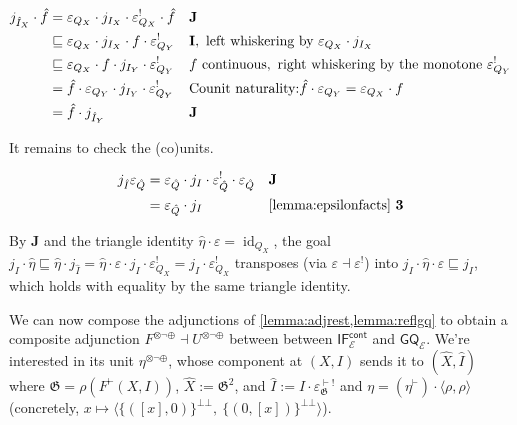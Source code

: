 \documentclass{article}
\theoremstyle{definition}
\newcommand{\G}{\mathfrak{G}}
\newcommand{\cE}{\mathcal{E}}
\newcommand{\cat}[1]{\mathsf{#1}}
\newcommand{\id}{\operatorname{id}}
\begin{document}
{\begin{align*}
        j_{\hat I_X}\cdot \hat f
          &=\varepsilon_{Q_X} \cdot j_{I_X} \cdot \varepsilon_{Q_X}^! \cdot \hat f
          && \text{\bf J}\\
          &\sqsubseteq \varepsilon_{Q_X} \cdot j_{I_X} \cdot f \cdot \varepsilon_{Q_Y}^!
          && \text{\bf I}, \text{ left whiskering by } \varepsilon_{Q_X} \cdot j_{I_X}\\
          &\sqsubseteq \varepsilon_{Q_X} \cdot f \cdot j_{I_Y} \cdot \varepsilon_{Q_Y}^!
          && f \text{ continuous},\ \text{right whiskering by the monotone } \varepsilon_{Q_Y}^!\\
          &= \hat f \cdot \varepsilon_{Q_Y} \cdot j_{I_Y} \cdot \varepsilon_{Q_Y}^!
          && \text{Counit naturality:} \hat f \cdot \varepsilon_{Q_Y} = \varepsilon_{Q_X} \cdot f\\
          &= \hat f \cdot j_{\hat I_Y}
          && \text{\bf J}
    \end{align*}
    

It remains to check the (co)units. 

\begin{align*}
    j_{\hat I} \varepsilon_{\hat Q}&=\varepsilon_{\hat Q} \cdot j_I \cdot  \varepsilon_{\hat Q}^! \cdot  \varepsilon_{\hat Q} &&\text{{\bf J}}\\ 
    &=\varepsilon_{\hat Q} \cdot j_I  &&\text{\cref{lemma:epsilonfacts} {\bf 3}}\\ 
\end{align*}


By {\bf J} and the triangle identity $\hat\eta\cdot\varepsilon=\id_{Q_X}$, the goal
    $j_I\cdot\hat\eta\sqsubseteq\hat\eta\cdot j_{\hat I}=\hat\eta\cdot\varepsilon\cdot j_I\cdot\varepsilon^!_{Q_X}=j_I\cdot\varepsilon^!_{Q_X}$
    transposes (via $\varepsilon\dashv\varepsilon^!$) into
    $j_I\cdot\hat\eta\cdot\varepsilon\sqsubseteq j_I$, which holds with equality by the
    same triangle identity.


}

We can now compose the adjunctions of \cref{lemma:adjrest,lemma:reflgq} to obtain a composite adjunction $F^{\otimes\neg\oplus}\dashv U^{\otimes\neg\oplus}$ between between $\cat{IF_\cE^{cont}}$ and $\cat{GQ}_\cE$. We're interested in its unit $\eta^{\otimes\neg\oplus}$, whose component at $(X,I)$ sends it to $(\hat X,\hat I)$ where $\G=\rho(F^\vdash(X,I))$, $\hat X:=\G^2$, and $\hat I:=I\cdot \varepsilon^{\vdash!}_{\G}$ and $\eta=(\eta^\vdash)\cdot \langle \rho,\rho\rangle$ (concretely, $x\mapsto \langle\{([x],0)\}^{\bot\bot},\ \{(0,[x])\}^{\bot\bot} \rangle$).
\end{document}
